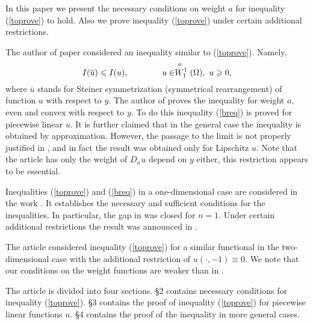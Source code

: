 In this paper we present the necessary conditions on weight $a$ for inequality (\ref{toprove}) to hold.
Also we prove inequality (\ref{toprove}) under certain additional restrictions.

The author of paper \cite{Br} considered an inequality similar to (\ref{toprove}).
Namely,
\begin{equation}
\label{breq}
I( \overline{u} ) \le I( u ), \qquad \qquad u \in \Wf( \Omega ),\ u \ge 0,
\end{equation}
where $\overline{u}$ stands for Steiner symmetrization (symmetrical rearrangement) of function $u$ with respect to $y$.
The author of \cite{Br} proves the inequality for weight $a$, even and convex with respect to $y$.
To do this inequality (\ref{breq}) is proved for piecewise linear $u$.
It is further claimed that in the general case the inequality is obtained by approximation.
However, the passage to the limit is not properly justified in \cite{Br},
and in fact the result was obtained only for Lipschitz $u$.
Note that the article \cite{Br} has only the weight of $D_n u$ depend on $y$ either,
this restriction appears to be essential.

Inequalities (\ref{toprove}) and (\ref{breq}) in a one-dimensional case are considered in the work \cite{1dim}.
It establishes the necessary and sufficient conditions for the inequalities.
In particular, the gap in \cite{Br} was closed for $n = 1$.
Under certain additional restrictions the result was announced in \cite{DAN}.

The article \cite{Lan} considered inequality (\ref{toprove}) for a similar functional in the two-dimensional case
with the additional restriction of $u(\cdot, -1) \equiv 0$.
We note that our conditions on the weight functions are weaker than in \cite{Lan}.

The article is divided into four sections.
\S2 contains necessary conditions for inequality (\ref{toprove}).
\S3 contains the proof of inequality (\ref{toprove}) for piecewise linear functions $u$.
\S4 contains the proof of the inequality in more general cases.